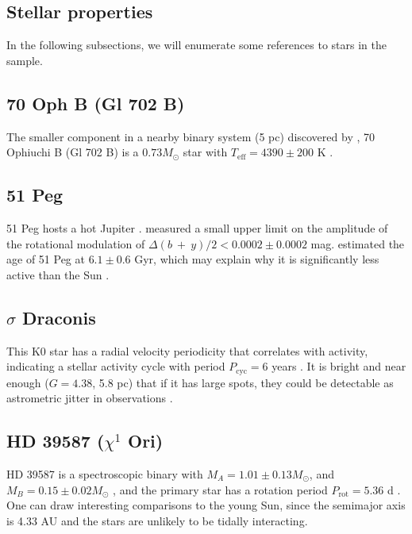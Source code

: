\begin{subappendices}

\section{Stellar properties} \label{app:stellarprops}

In the following subsections, we will enumerate some references to stars in the sample. 
% 
\subsection{70 Oph B (Gl 702 B)}

The smaller component in a nearby binary system (5 pc) 
discovered by \citet{Herschel1782}, 70 Ophiuchi B (Gl 702 B) is a $0.73 M_\odot$ star with $T_\mathrm{eff} = 4390 \pm 200$ K \citep{Eggenberger2008}. 

\subsection{51 Peg}
51 Peg hosts a hot Jupiter \citep{Mayor1995}.
\citet{Henry1997} measured a small upper limit on the 
amplitude of the rotational modulation of $\Delta(b~+~y)/2 < 0.0002 \pm 0.0002$ mag. 
\citet{Mittag2016} estimated the age of 51 Peg at 
$6.1 \pm 0.6$ Gyr, which may explain why it is significantly less active than the Sun \citep[e.g.,][]{Mamajek2008}.
 
\subsection{$\sigma$ Draconis}
This K0 star has a radial velocity periodicity that correlates with activity, indicating a stellar activity cycle with period $P_\mathrm{cyc} = 6$ years \citep{Butler2017}. 
It is bright and near enough ($G = 4.38$, 5.8 pc) 
that if it has large spots, 
they could be detectable as astrometric jitter in \gaia observations \citep{Morris2018e}.

\subsection{HD 39587 ($\chi^1$ Ori)}

HD 39587 is a spectroscopic binary with $M_A = 1.01 \pm 0.13 M_\odot$, and $M_B = 0.15 \pm 0.02 M_\odot$ \citep{Konig2002}, and the primary star has a rotation period $P_\mathrm{rot} = 5.36$ d \citep{Wright2011}. 
One can draw interesting comparisons to the young Sun, 
since the semimajor axis is 4.33 AU and the stars are 
unlikely to be tidally interacting.


\end{subappendices}
